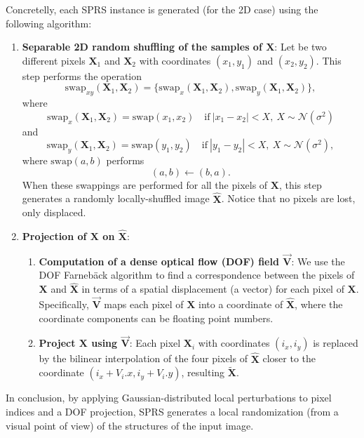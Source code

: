 \documentclass{article}
\begin{document}
Concretelly, each SPRS instance is generated (for the 2D case) using
the following algorithm:
\begin{enumerate}
\item \textbf{Separable 2D random shuffling of the samples of
    $\mathbf{X}$}: Let be two different pixels $\mathbf{X}_1$ and
  $\mathbf{X}_2$ with coordinates $(x_1, y_1)$ and $(x_2, y_2)$. This
  step performs the operation
  \begin{equation}
    \text{swap}_{xy}(\mathbf{X}_1,\mathbf{X}_2) = \{\text{swap}_x(\mathbf{X}_1,\mathbf{X}_2), \text{swap}_y(\mathbf{X}_1,\mathbf{X}_2)\},
  \end{equation}
  where
  \begin{equation}
    \text{swap}_x(\mathbf{X}_1,\mathbf{X}_2) = \text{swap}(x_1, x_2)\quad\text{if}~|x_1-x_2|<X,~X\sim\mathcal{N}(\sigma^2)
  \end{equation}
  and
  \begin{equation}
    \text{swap}_y(\mathbf{X}_1,\mathbf{X}_2) = \text{swap}(y_1, y_2)\quad\text{if}~|y_1-y_2|<X,~X\sim\mathcal{N}(\sigma^2),
  \end{equation}
  where $\text{swap}(a,b)$ performs
  \begin{equation}
    (a,b) \leftarrow (b,a).
  \end{equation}
  When these swappings are performed for all the pixels of
  $\mathbf{X}$, this step generates a randomly locally-shuffled image
  $\hat{\mathbf{X}}$. Notice that no pixels are lost, only displaced.

\item \textbf{Projection of $\mathbf{X}$ on $\hat{\mathbf{X}}$}:
  \begin{enumerate}
  \item \textbf{Computation of a dense optical flow (DOF) field
      $\overrightarrow{\mathbf{V}}$}: We use the DOF Farneb\"ack
    algorithm \cite{farneback2003two} to find a correspondence between
    the pixels of $\mathbf{X}$ and $\hat{\mathbf{X}}$ in terms of a
    spatial displacement (a vector) for each pixel of
    $\mathbf{X}$. Specifically, $\overrightarrow{\mathbf{V}}$ maps each
    pixel of $\mathbf{X}$ into a coordinate of $\hat{\mathbf{X}}$,
    where the coordinate components can be floating point numbers.
  \item \textbf{Project $\mathbf{X}$ using
      $\overrightarrow{\mathbf{V}}$}: Each pixel $\mathbf{X}_i$
    with coordinates $(i_x, i_y)$ is replaced by the bilinear
    interpolation of the four pixels of $\hat{\mathbf{X}}$ closer to
    the coordinate $(i_x+V_i.x,i_y+V_i.y)$, resulting
    $\tilde{\mathbf{X}}$.
  \end{enumerate}
\end{enumerate}

In conclusion, by applying Gaussian-distributed local perturbations to
pixel indices and a DOF projection, SPRS generates a local
randomization (from a visual point of view) of the structures of the
input image.


\printglossary[type=\acronymtype]



\end{document}
